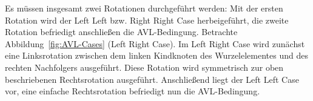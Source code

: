 Es müssen insgesamt zwei Rotationen durchgeführt werden:
Mit der ersten Rotation wird der Left Left bzw. Right Right Case
herbeigeführt, die zweite Rotation befriedigt anschließen die AVL-Bedingung.
Betrachte Abbildung~\ref{fig:AVL-Cases} (Left Right Case).
Im Left Right Case wird zunächst eine Linksrotation zwischen dem linken
Kindknoten des Wurzelelementes und des rechten Nachfolgers ausgeführt.
Diese Rotation wird symmetrisch zur oben beschriebenen Rechtsrotation ausgeführt.
Anschließend liegt der Left Left Case vor, eine einfache Rechtsrotation
befriedigt nun die AVL-Bedingung.


\begin{figure}[hbt]
    \centering
    \begin{minipage}[c]{.45\textwidth}
\end{minipage}
\end{figure}
